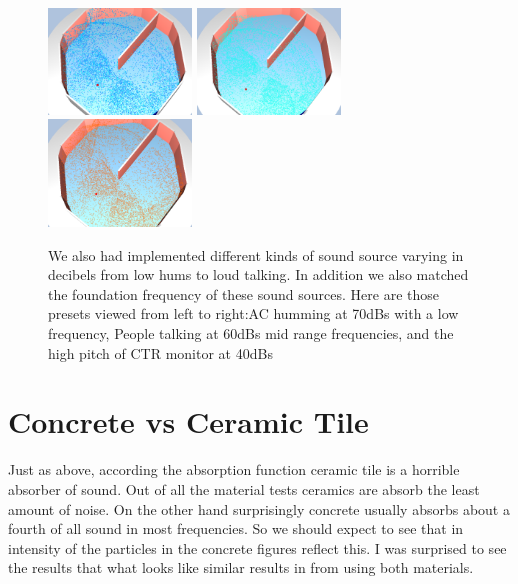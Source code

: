 \documentclass{thesis}
\begin{document}
    \begin{figure}
        \centering
        \includegraphics[width=1.5in]{images/low}
        \includegraphics[width=1.5in]{images/med}
        \includegraphics[width=1.5in]{images/high}
        \caption{We also had implemented different kinds of sound source varying in decibels from low hums to loud talking. In addition we also matched the foundation frequency of these sound sources. Here are those presets viewed from left to right:AC humming at 70dBs with a low frequency, People talking at 60dBs mid range frequencies, and the high pitch of CTR monitor at 40dBs}
    \end{figure}

\section{ Concrete vs Ceramic Tile}
Just as above, according the absorption function ceramic tile is a horrible absorber of sound. Out of all the material tests ceramics are absorb the least amount of noise. On the other hand surprisingly concrete usually absorbs about a fourth of all sound in most frequencies. So we should expect to see that in intensity of the particles in the concrete figures reflect this.
I was surprised to see the results that what looks like similar results in from using both materials. 

\end{document}
